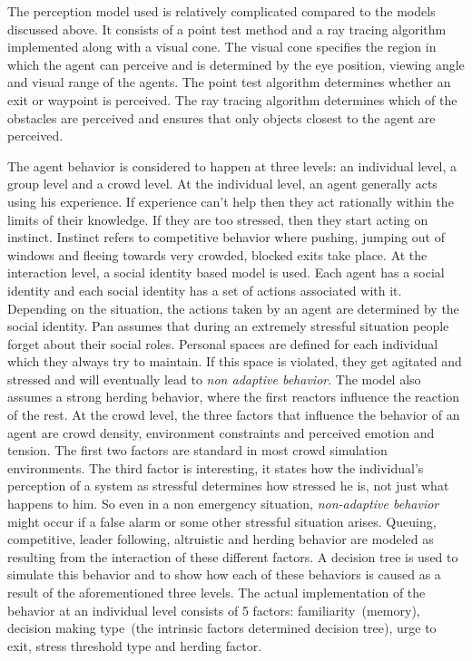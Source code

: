 The perception model used is relatively complicated compared to the models discussed above. It consists of a point test method and a ray tracing algorithm implemented along with a visual cone. The visual cone specifies the region in which the agent can perceive and is determined by the eye position, viewing angle and visual range of the agents. The point test algorithm determines whether an exit or waypoint is perceived. The ray tracing algorithm determines which of the obstacles are perceived and ensures that only objects closest to the agent are perceived.

The agent behavior is considered to happen at three levels: an individual level, a group level and a crowd level. At the individual level, an agent generally acts using his experience. If experience can't help then they act rationally within the limits of their knowledge. If they are too stressed, then they start acting on instinct. Instinct refers to competitive behavior where pushing, jumping out of windows and fleeing towards very crowded, blocked exits take place. At the interaction level, a social identity based model is used. Each agent has a social identity and each social identity has a set of actions associated with it. Depending on the situation, the actions taken by an agent are determined by the social identity. Pan assumes that during an extremely stressful situation people forget about their social roles. Personal spaces are defined for each individual which they always try to maintain. If this space is violated, they get agitated and stressed and will eventually lead to \emph{non adaptive behavior}. The model also assumes a strong herding behavior, where the first reactors influence the reaction of the rest. At the crowd level, the three factors that influence the behavior of an agent are crowd density, environment constraints and perceived emotion and tension. The first two factors are standard in most crowd simulation environments. The third factor is interesting, it states how the individual's perception of a system as stressful determines how stressed he is, not just what happens to him. So even in a non emergency situation, \emph{non-adaptive behavior} might occur if a false alarm or some other stressful situation arises. Queuing, competitive, leader following, altruistic and herding behavior are modeled as resulting from the interaction of these different factors. A decision tree is used to simulate this behavior and to show how each of these behaviors is caused as a result of the aforementioned three levels. The actual implementation of the behavior at an individual level consists of 5 factors: familiarity~(memory), decision making type~(the intrinsic factors determined decision tree), urge to exit, stress threshold type and herding factor.

